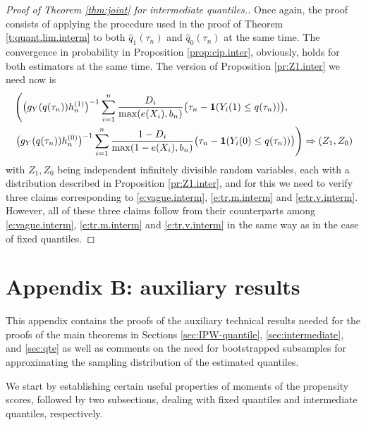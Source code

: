 \documentclass[12pt]{amsart}
\newcommand{\1}{\mathbbm{1}}
\newcommand{\0}{\mathbf{0}}
\newcommand{\one}{\mathbf{1}}
\theoremstyle{plain}
\theoremstyle{definition}
\begin{document}
\begin{proof}[Proof of Theorem \ref{thm:joint} for intermediate quantiles.] Once again, the proof consists of applying the procedure used in the proof of Theorem \ref{t:quant.lim.interm} to both $\hat q_1(\tau_n)$ and $\hat q_0(\tau_n)$ at the same time. The convergence in probability in Proposition \ref{prop:cip.inter}, obviously, holds for both estimators at the same time. The version of Proposition \ref{pr:Z1.inter} we need now is 
\begin{align*} \label{e:interm.2sided.prop}
&\left(\bigl(g_Y(q(\tau_n))h_n^{(1)}\bigr)^{-1} \sum_{i=1}^n \frac{D_i}{\max(e(X_i),b_n)}
  \bigl( \tau_n-\one(Y_i(1)\leq q(\tau_n))\bigr),
\right. \\
\notag & \left. \bigl(g_Y(q(\tau_n))h_n^{(0)}\bigr)^{-1} \sum_{i=1}^n \frac{1-D_i}{\max(1-e(X_i),b_n)}
  \bigl( \tau_n-\one(Y_i(0)\leq q(\tau_n))\bigr) 
  \right) 
 \Rightarrow (Z_1,Z_0)
    \end{align*}
with $Z_1,Z_0$ being independent infinitely divisible random variables, each with a distribution described in Proposition \ref{pr:Z1.inter}, and for this we need to verify three claims corresponding to \eqref{e:vague.interm}, \eqref{e:tr.m.interm} and \eqref{e:tr.v.interm}. However, all of these three claims follow from their counterparts among 
\eqref{e:vague.interm}, \eqref{e:tr.m.interm} and \eqref{e:tr.v.interm} in the same way as in the case of fixed quantiles. 
 \end{proof}


% 

\newpage

\section*{Appendix B: auxiliary results} \label{app:B} 

This appendix contains 
the proofs of the auxiliary technical results needed for the proofs of the main theorems in 
Sections \ref{sec:IPW-quantile}, \ref{sec:intermediate}, and \ref{sec:qte} as well as comments on the need for bootstrapped subsamples for approximating the sampling distribution of the estimated quantiles.

We start by establishing certain useful properties of moments of the propensity scores, followed by two subsections, dealing with fixed quantiles and intermediate quantiles, respectively.
\end{document}

